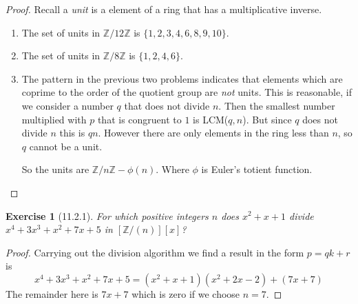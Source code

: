 \documentclass[12pt]{article}
\newtheorem*{exer}{Exercise}
\begin{document}
\begin{proof}

    Recall a \textit{unit} is a element of a ring that has a
    multiplicative inverse.

    \begin{enumerate}
        \item The set of units in $\mathbb{Z}/12\mathbb{Z}$ is $\{1, 2,
            3, 4, 6, 8, 9, 10\}$.

        \item The set of units in $\mathbb{Z}/8\mathbb{Z}$ is $\{1, 2,
            4, 6\}$.

        \item The pattern in the previous two problems indicates that
            elements which are coprime to the order of the quotient
            group are \textit{not} units. This is reasonable, if we
            consider a number $q$ that does not divide $n$. Then the
            smallest number multiplied with $p$ that is congruent to $1$
            is LCM($q,n$). But since $q$ does not divide $n$ this is
            $qn$.  However there are only elements in the ring less than
            $n$, so $q$ cannot be a unit.

            So the units are $\mathbb{Z}/n\mathbb{Z} - \phi(n)$. Where
            $\phi$ is Euler's totient function.

    \end{enumerate}
\end{proof}


\begin{exer}[11.2.1]

    For which positive integers $n$ does $x^2 + x + 1$ divide $x^4 +
    3x^3 + x^2 + 7x + 5$ in $[\mathbb{Z}/(n)][x]$?

\end{exer}

\begin{proof}

    Carrying out the division algorithm we find a result in the form $p
    = qk + r$ is
    \[
        x^4 + 3x^3 + x^2 + 7x + 5 = (x^2 + x + 1)(x^2 + 2x - 2) + (7x +
        7)
    \]
    The remainder here is $7x + 7$ which is zero if we choose $n = 7$.

\end{proof}

\end{document}
